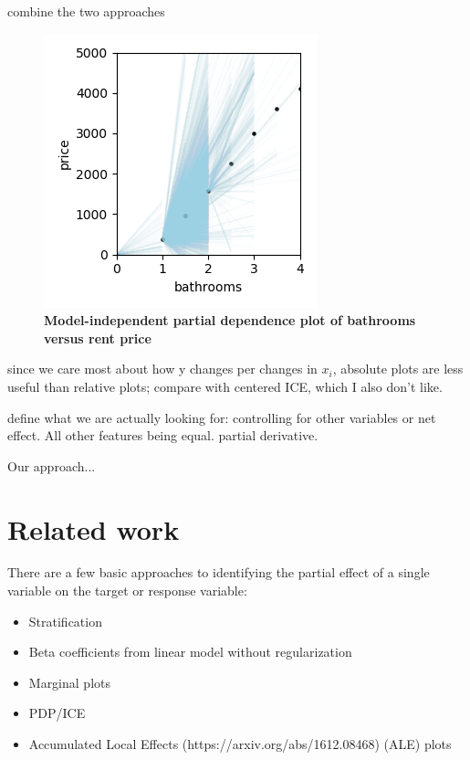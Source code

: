 \documentclass[12pt]{article}
\begin{document}
combine the two approaches

\begin{figure}[htbp]
\begin{center}
\includegraphics[scale=0.7]{images/baths_vs_price_mipd.png}
\caption{{\bf  Model-independent partial dependence plot of bathrooms versus rent price}}
\label{fig:baths_price_mipd}
\end{center}
\end{figure}

since we care most about how y changes per changes in $x_i$, absolute plots are less useful than relative plots; compare with centered ICE, which I also don't like.

define what we are actually looking for: controlling for other variables or net effect. All other features being equal. partial derivative.

Our approach...

\section{Related work}

There are a few basic approaches to identifying the partial effect of a single variable on the target or response variable:

\begin{itemize}
\item Stratification
\item Beta coefficients from linear model without regularization
\item Marginal plots
\item PDP/ICE
\item Accumulated Local Effects (https://arxiv.org/abs/1612.08468) (ALE) plots
\end{itemize}
\end{document}
